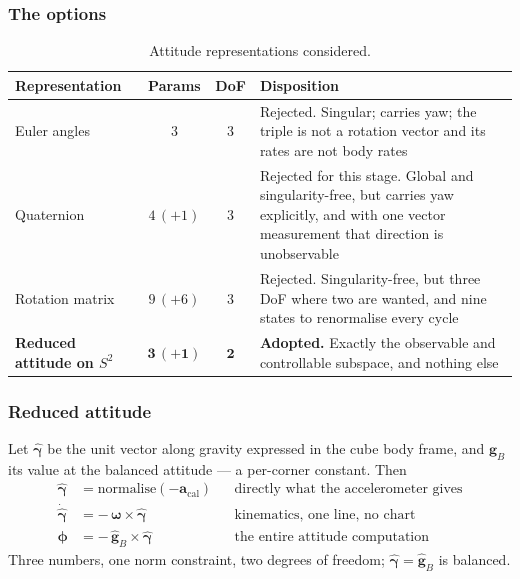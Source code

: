 \subsubsection{The options}

\begin{table}[htbp]
\centering
\small
\begin{tabular}{@{}lccp{58mm}@{}}
\toprule
\textbf{Representation} & \textbf{Params} & \textbf{DoF} & \textbf{Disposition}\\
\midrule
Euler angles & 3 & 3 &
  Rejected. Singular; carries yaw; the triple is not a rotation vector and
  its rates are not body rates\\[0.35em]
Quaternion & $4\,(+1)$ & 3 &
  Rejected for this stage. Global and singularity-free, but carries yaw
  explicitly, and with one vector measurement that direction is
  unobservable\\[0.35em]
Rotation matrix & $9\,(+6)$ & 3 &
  Rejected. Singularity-free, but three DoF where two are wanted, and nine
  states to renormalise every cycle\\[0.35em]
\textbf{Reduced attitude on $S^2$} & $\bm{3\,(+1)}$ & $\bm{2}$ &
  \textbf{Adopted.} Exactly the observable and controllable subspace, and
  nothing else\\
\bottomrule
\end{tabular}
\caption{Attitude representations considered.}
\label{tab:attitude-options}
\end{table}

\subsubsection{Reduced attitude}
\label{sec:reduced-attitude}

Let $\hat{\bm{\gamma}}$ be the unit vector along gravity expressed in the
cube body frame, and $\hat{\bm{g}}_B$ its value at the balanced attitude --- a
per-corner constant. Then
%
\begin{align}
  \hat{\bm{\gamma}} &= \mathrm{normalise}(-\bm{a}_{\mathrm{cal}})
    && \text{directly what the accelerometer gives}
    \label{eq:gam-meas}\\[0.2em]
  \dot{\hat{\bm{\gamma}}} &= -\,\bm{\omega}\times\hat{\bm{\gamma}}
    && \text{kinematics, one line, no chart}
    \label{eq:gam-kin}\\[0.2em]
  \bm{\phi} &= -\,\hat{\bm{g}}_B\times\hat{\bm{\gamma}}
    && \text{the entire attitude computation}
    \label{eq:phi}
\end{align}
%
Three numbers, one norm constraint, two degrees of freedom;
$\hat{\bm{\gamma}}=\hat{\bm{g}}_B$ is balanced.

